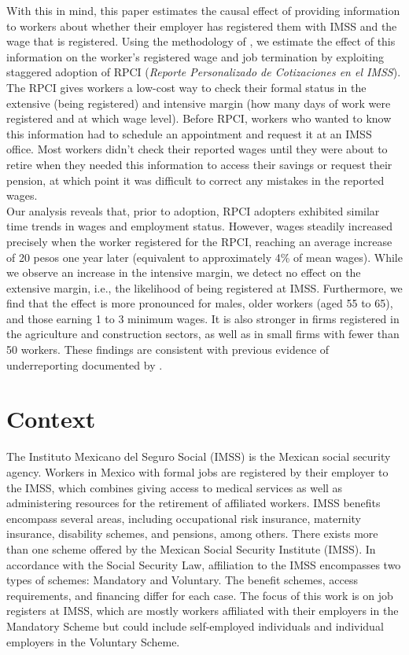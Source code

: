 \documentclass[10pt, oneside]{book}
\begin{document}
With this in mind, this paper estimates the causal effect of providing information to workers about whether their employer has registered them with IMSS and the wage that is registered. Using the methodology of \cite{deChaisemartin2022}, we estimate the effect of this information on the worker's registered wage and job termination by exploiting staggered adoption of RPCI (\textit{Reporte Personalizado de Cotizaciones en el IMSS}). The RPCI gives workers a low-cost way to check their formal status in the extensive (being registered) and intensive margin (how many days of work were registered and at which wage level). Before RPCI, workers who wanted to know this information had to schedule an appointment and request it at an IMSS office. Most workers didn't check their reported wages until they were about to retire when they needed this information to access their savings or request their pension, at which point it was difficult to correct any mistakes in the reported wages. \\

Our analysis reveals that, prior to adoption, RPCI adopters exhibited similar time trends in wages and employment status. However, wages steadily increased precisely when the worker registered for the RPCI, reaching an average increase of 20 pesos one year later (equivalent to approximately 4\% of mean wages). While we observe an increase in the intensive margin, we detect no effect on the extensive margin, i.e., the likelihood of being registered at IMSS. Furthermore, we find that the effect is more pronounced for males, older workers (aged 55 to 65), and those earning 1 to 3 minimum wages. It is also stronger in firms registered in the agriculture and construction sectors, as well as in small firms with fewer than 50 workers. These findings are consistent with previous evidence of underreporting documented by \cite{kumler2020enlisting}. \\

\chapter{Context} \label{context}

The Instituto Mexicano del Seguro Social (IMSS) is the Mexican social security agency. Workers in Mexico with formal jobs are registered by their employer to the IMSS, which combines giving access to medical services as well as administering resources for the retirement of affiliated workers. IMSS benefits encompass several areas, including occupational risk insurance, maternity insurance, disability schemes, and pensions, among others. There exists more than one scheme offered by the Mexican Social Security Institute (IMSS). In accordance with the Social Security Law, affiliation to the IMSS encompasses two types of schemes: Mandatory and Voluntary. The benefit schemes, access requirements, and financing differ for each case. The focus of this work is on job registers at IMSS, which are mostly workers affiliated with their employers in the Mandatory Scheme but could include self-employed individuals and individual employers in the Voluntary Scheme. \\
\end{document}
